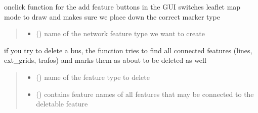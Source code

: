 \documentclass[letterpaper,10pt,english]{sphinxmanual}
\begin{document}
\begin{fulllineitems}
\label{\detokenize{docs_gui/js_api/network_editor/add_delete_new_network_features:addFeature}}
\pysigstartsignatures
{}
\pysigstopsignatures
\sphinxAtStartPar
onclick function for the add feature buttons in the GUI
switches leaflet map mode to draw and makes sure we place down the correct marker type
\begin{quote}\begin{description}
\begin{itemize}
\item {} 
\sphinxAtStartPar
{} () \textendash{} name of the network feature type we want to create

\end{itemize}

\end{description}\end{quote}

\end{fulllineitems}


\begin{fulllineitems}
\label{\detokenize{docs_gui/js_api/network_editor/add_delete_new_network_features:prepareFeatureDelete}}
\pysigstartsignatures
{}
\pysigstopsignatures
\sphinxAtStartPar
if you try to delete a bus, the function tries to find all connected features (lines, ext\_grids, trafos) and marks them as about to be deleted as well
\begin{quote}\begin{description}
\begin{itemize}
\item {} 
\sphinxAtStartPar
{} () \textendash{} name of the feature type to delete

\item {} 
\sphinxAtStartPar
{} () \textendash{} contains feature names of all features that may be connected to the deletable feature

\end{itemize}

\end{description}\end{quote}

\end{fulllineitems}
\end{document}

